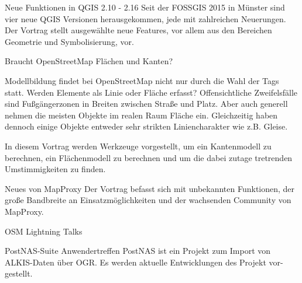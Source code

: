 %
{Neue Funktionen in QGIS 2.10 - 2.16}%
{}%
{Seit der FOSSGIS 2015 in Münster sind vier neue QGIS Versionen herausgekommen, jede mit zahlreichen Neuerungen. Der Vortrag stellt ausgewählte neue Features, vor allem aus den Bereichen Geometrie und Symbolisierung, vor.}

%
{Braucht OpenStreetMap Flächen und Kanten?}%
{}%
{Modellbildung findet bei OpenStreetMap nicht nur durch die Wahl der Tags statt.
Werden Elemente als Linie oder Fläche erfasst?
Offensichtliche Zweifelsfälle sind Fußgängerzonen in Breiten zwischen Straße und Platz.
Aber auch generell nehmen die meisten Objekte im realen Raum Fläche ein.
Gleichzeitig haben dennoch einige Objekte entweder sehr strikten Liniencharakter wie z.B. Gleise.

In diesem Vortrag werden Werkzeuge vorgestellt,
um ein Kantenmodell zu berechnen, ein Flächenmodell zu berechnen
und um die dabei zutage tretrenden Umstimmigkeiten zu finden.
}


%
{Neues von MapProxy}%
{}%
{Der Vortrag befasst sich mit unbekannten Funktionen, der große Bandbreite an Einsatzmöglichkeiten und der wachsenden Community von MapProxy.}


%
{OSM Lightning Talks}%
{}%
{}

%
{PostNAS-Suite Anwendertreffen}%
{}%
{PostNAS ist ein Projekt zum Import von ALKIS-Daten über
OGR. Es werden aktuelle Entwicklungen des Projekt vor-
gestellt.}\label{bof-montag}
